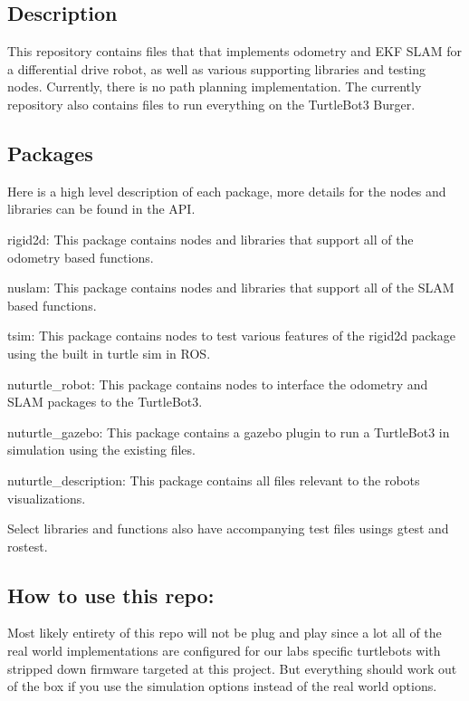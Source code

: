 \subsection*{Description}

This repository contains files that that implements odometry and E\+KF S\+L\+AM for a differential drive robot, as well as various supporting libraries and testing nodes. Currently, there is no path planning implementation. The currently repository also contains files to run everything on the Turtle\+Bot3 Burger.

\subsection*{Packages}

Here is a high level description of each package, more details for the nodes and libraries can be found in the A\+PI.


\begin{DoxyItemize}
\item {\ttfamily rigid2d}\+: This package contains nodes and libraries that support all of the odometry based functions.
\item {\ttfamily nuslam}\+: This package contains nodes and libraries that support all of the S\+L\+AM based functions.
\item {\ttfamily tsim}\+: This package contains nodes to test various features of the rigid2d package using the built in turtle sim in R\+OS.
\item {\ttfamily nuturtle\+\_\+robot}\+: This package contains nodes to interface the odometry and S\+L\+AM packages to the Turtle\+Bot3.
\item {\ttfamily nuturtle\+\_\+gazebo}\+: This package contains a gazebo plugin to run a Turtle\+Bot3 in simulation using the existing files.
\item {\ttfamily nuturtle\+\_\+description}\+: This package contains all files relevant to the robots visualizations.
\end{DoxyItemize}

Select libraries and functions also have accompanying test files usings {\ttfamily gtest} and {\ttfamily rostest}.

\subsection*{How to use this repo\+:}

Most likely entirety of this repo will not be plug and play since a lot all of the real world implementations are configured for our lab\textquotesingle{}s specific turtlebots with stripped down firmware targeted at this project. But everything should work out of the box if you use the simulation options instead of the real world options.

